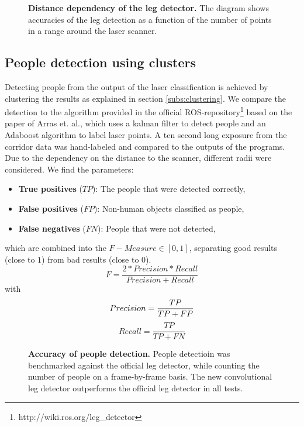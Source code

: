 \begin{figure}
	\normalsize
	\begin{center}
		
	\end{center}
	\caption{\textbf{Distance dependency of the leg detector.} The diagram shows accuracies of the leg detection as a function of the number of points in a range around the laser scanner.}
	\label{fig:radius_detection}
\end{figure}

\subsection{People detection using clusters}

Detecting people from the output of the laser classification is achieved by clustering the results as explained in section \ref{subs:clustering}. We compare the detection to the algorithm provided in the official ROS-repository\footnote{http://wiki.ros.org/leg\_detector} based on the paper of Arras et. al.\cite{Arras07usingboosted}, which uses a kalman filter to detect people and an Adaboost algorithm to label laser points. A ten second long exposure from the corridor data was hand-labeled and compared to the outputs of the programs. Due to the dependency on the distance to the scanner, different radii were considered. We find the parameters:
\begin{itemize}
	\item \textbf{True positives} ($TP$): The people that were detected correctly,
	\item \textbf{False positives} ($FP$): Non-human objects classified as people,
	\item \textbf{False negatives} ($FN$): People that were not detected,
\end{itemize}
which are combined into the $F-Measure \in \left[ 0,1 \right]$, separating good results (close to $1$) from bad results (close to $0$).
\begin{equation}
	F=\frac{2*Precision*Recall}{Precision+Recall}
\end{equation}
with
\begin{equation}
	Precision = \frac{TP}{TP + FP}\\
\end{equation}
\begin{equation}
	Recall = \frac{TP}{TP + FN}
\end{equation}

\begin{figure}
	\normalsize
	\begin{center}
		
	\end{center}
	\caption{\textbf{Accuracy of people detection.} People detectioin was benchmarked against the official leg detector, while counting the number of people on a frame-by-frame basis. The new convolutional leg detector outperforms the official leg detector in all tests.}
	\label{fig:people_detection}
\end{figure}

